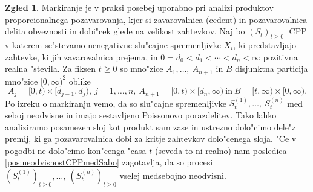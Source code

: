 \documentclass[12pt, a4paper, reqno]{amsart}
\theoremstyle{definition}
\newtheorem{zgled}[definicija]{Zgled}
\theoremstyle{plain}
\newcommand{\1}{\mathds{1}}
\DeclareMathOperator{\CPP}{CPP}
\begin{document}
        \begin{zgled}
            Markiranje je v praksi posebej uporabno pri analizi produktov 
            proporcionalnega pozavarovanja, kjer si zavarovalnica (cedent) in  
            pozavarovalnica delita obveznosti in dobi"cek glede na velikost zahtevkov. Naj bo $(S_t)_{t\geq0}$ $\CPP$  
            v katerem se"stevamo nenegativne slu"cajne spremenljivke $X_i$, ki predstavljajo zahtevke, 
            ki jih zavarovalnica prejema, in $ 0 = d_0 < d_1 < \cdots < d_n < \infty$ pozitivna realna "stevila. 
            Za fiksen $t\geq0$ so mno"zice 
            $A_1, \dots, \ A_{n + 1}$ in $B$ disjunktna particija mno"zice $[0, \infty)^2$ oblike 
            \begin{equation*}
                A_j = [0, t)\times [d_{j-1}, d_j), \ j = 1, \dots, n, \ A_{n+1} = [0, t)\times [d_n, \infty) \ \text{in} \ B = [t, \infty)\times [0, \infty).
            \end{equation*}
            Po izreku o markiranju vemo, da so slu"cajne spremenljivke $S_t^{(1)}, \dots, \ S_t^{(n)}$ 
            med seboj neodvisne in imajo sestavljeno Poissonovo porazdelitev. Tako lahko analiziramo 
            posamezen sloj kot produkt sam zase in ustrezno dolo"cimo dele"z premij, ki ga pozavarovalnica dobi 
            za kritje zahtevkov dolo"cenega sloja. "Ce v pogodbi ne dolo"cimo kon"cenga "casa $t$ (seveda
            to ni realno) nam posledica \ref{pos:neodvisnostCPPmedSabo} zagotavlja, da so procesi 
            $(S_t^{(1)})_{t\geq0}, \dots, \ (S_t^{(n)})_{t\geq0}$ vselej medsebojno neodvisni.
        \end{zgled}
\end{document}
